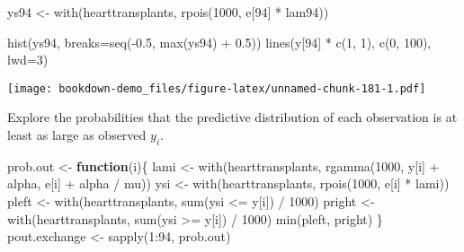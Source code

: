 \documentclass[
]{book}
\newenvironment{Shaded}{\begin{snugshade}}{\end{snugshade}}
\newcommand{\AttributeTok}[1]{\textcolor[rgb]{0.77,0.63,0.00}{#1}}
\newcommand{\ControlFlowTok}[1]{\textcolor[rgb]{0.13,0.29,0.53}{\textbf{#1}}}
\newcommand{\DecValTok}[1]{\textcolor[rgb]{0.00,0.00,0.81}{#1}}
\newcommand{\FloatTok}[1]{\textcolor[rgb]{0.00,0.00,0.81}{#1}}
\newcommand{\FunctionTok}[1]{\textcolor[rgb]{0.00,0.00,0.00}{#1}}
\newcommand{\NormalTok}[1]{#1}
\newcommand{\OtherTok}[1]{\textcolor[rgb]{0.56,0.35,0.01}{#1}}
\newcommand{\SpecialCharTok}[1]{\textcolor[rgb]{0.00,0.00,0.00}{#1}}
\begin{document}
\begin{Shaded}
\begin{Highlighting}[]
\NormalTok{ys94 }\OtherTok{\textless{}{-}} \FunctionTok{with}\NormalTok{(hearttransplants,}
           \FunctionTok{rpois}\NormalTok{(}\DecValTok{1000}\NormalTok{, e[}\DecValTok{94}\NormalTok{] }\SpecialCharTok{*}\NormalTok{ lam94))}
\end{Highlighting}
\end{Shaded}

\begin{Shaded}
\begin{Highlighting}[]
\FunctionTok{hist}\NormalTok{(ys94, }\AttributeTok{breaks=}\FunctionTok{seq}\NormalTok{(}\SpecialCharTok{{-}}\FloatTok{0.5}\NormalTok{, }\FunctionTok{max}\NormalTok{(ys94) }\SpecialCharTok{+} \FloatTok{0.5}\NormalTok{))}
\FunctionTok{lines}\NormalTok{(y[}\DecValTok{94}\NormalTok{] }\SpecialCharTok{*} \FunctionTok{c}\NormalTok{(}\DecValTok{1}\NormalTok{, }\DecValTok{1}\NormalTok{), }\FunctionTok{c}\NormalTok{(}\DecValTok{0}\NormalTok{, }\DecValTok{100}\NormalTok{), }\AttributeTok{lwd=}\DecValTok{3}\NormalTok{)}
\end{Highlighting}
\end{Shaded}

\texttt{[image: bookdown-demo\_files/figure-latex/unnamed-chunk-181-1.pdf]}

Explore the probabilities that the predictive distribution of each observation is at least as large as observed \(y_i\).

\begin{Shaded}
\begin{Highlighting}[]
\NormalTok{prob.out }\OtherTok{\textless{}{-}} \ControlFlowTok{function}\NormalTok{(i)\{}
\NormalTok{   lami }\OtherTok{\textless{}{-}} \FunctionTok{with}\NormalTok{(hearttransplants,}
      \FunctionTok{rgamma}\NormalTok{(}\DecValTok{1000}\NormalTok{, y[i] }\SpecialCharTok{+}\NormalTok{ alpha, }
\NormalTok{             e[i] }\SpecialCharTok{+}\NormalTok{ alpha }\SpecialCharTok{/}\NormalTok{ mu))}
\NormalTok{   ysi }\OtherTok{\textless{}{-}} \FunctionTok{with}\NormalTok{(hearttransplants,}
      \FunctionTok{rpois}\NormalTok{(}\DecValTok{1000}\NormalTok{, e[i] }\SpecialCharTok{*}\NormalTok{ lami))}
\NormalTok{   pleft }\OtherTok{\textless{}{-}} \FunctionTok{with}\NormalTok{(hearttransplants,}
      \FunctionTok{sum}\NormalTok{(ysi }\SpecialCharTok{\textless{}=}\NormalTok{ y[i]) }\SpecialCharTok{/} \DecValTok{1000}\NormalTok{)}
\NormalTok{   pright }\OtherTok{\textless{}{-}} \FunctionTok{with}\NormalTok{(hearttransplants,}
      \FunctionTok{sum}\NormalTok{(ysi }\SpecialCharTok{\textgreater{}=}\NormalTok{ y[i]) }\SpecialCharTok{/} \DecValTok{1000}\NormalTok{)}
   \FunctionTok{min}\NormalTok{(pleft, pright)}
\NormalTok{ \}}
\NormalTok{pout.exchange }\OtherTok{\textless{}{-}} \FunctionTok{sapply}\NormalTok{(}\DecValTok{1}\SpecialCharTok{:}\DecValTok{94}\NormalTok{, prob.out)}
\end{Highlighting}
\end{Shaded}
\end{document}
